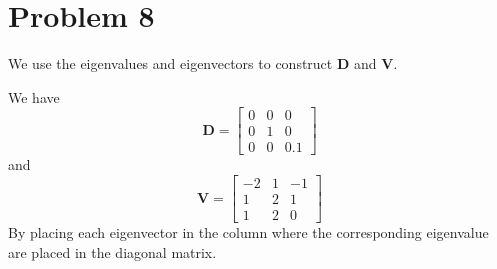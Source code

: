 \documentclass[12pt,a4paper]{article}
\begin{document}
\section*{Problem 8}
\begin{solution}
    
We use the eigenvalues and eigenvectors to construct $\mathbf{D}$ and $\mathbf{V}$.

We have
$$
\mathbf{D} = 
\begin{bmatrix}
    0 & 0 & 0\\
    0 & 1 & 0\\
    0 & 0 & 0.1
\end{bmatrix}
$$
and
$$
\mathbf{V} = 
\begin{bmatrix}
    -2 & 1 & -1\\
    1 & 2 & 1\\
    1 & 2 & 0
\end{bmatrix}
$$
By placing each eigenvector in the column where the corresponding eigenvalue are placed in the diagonal matrix.


\end{solution}
\end{document}
